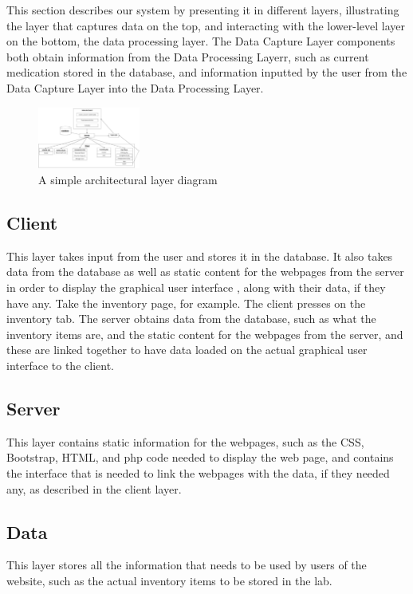 This section describes our system by presenting it in different layers, illustrating the layer that captures data on the top, and interacting with the lower-level layer on the bottom, the data processing layer. The Data Capture Layer components both obtain information from the Data Processing Layerr, such as current medication stored in the database, and information inputted by the user from the Data Capture Layer into the Data Processing Layer.  

\begin{figure}[h!]
	\centering
 	\includegraphics[width=0.3\textwidth]{images/systemoverview}
 \caption{A simple architectural layer diagram}
\end{figure}

\subsection{Client}
This layer takes input from the user and stores it in the database. It also takes data from the database as well as static content for the webpages from the server in order to display the graphical user interface , along with their data, if they have any. Take the inventory page, for example. The client presses on the inventory tab. The server obtains data from the database, such as what the inventory items are, and the static content for the webpages from the server, and these are linked together to have data loaded on the actual graphical user interface to the client. 

\subsection{Server}
This layer contains static information for the webpages, such as the CSS, Bootstrap, HTML, and php code needed to display the web page, and contains the interface that is needed to link the webpages with the data, if they needed any, as described in the client layer.

\subsection{Data}
This layer stores all the information that needs to be used by users of the website, such as the actual inventory items to be stored in the lab. 